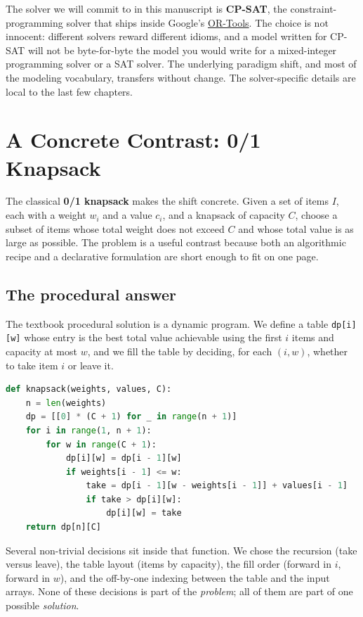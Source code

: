 The solver we will commit to in this manuscript is \textbf{CP-SAT}, the
constraint-programming solver that ships inside Google's
\href{https://developers.google.com/optimization}{OR-Tools}. The choice
is not innocent: different solvers reward different idioms, and a model
written for CP-SAT will not be byte-for-byte the model you would write
for a mixed-integer programming solver or a SAT solver. The underlying
paradigm shift, and most of the modeling vocabulary, transfers without
change. The solver-specific details are local to the last few chapters.

\section{A Concrete Contrast: 0/1 Knapsack}\label{sec:1.1}

The classical \textbf{0/1 knapsack} makes the shift concrete. Given a
set of items \(I\), each with a weight \(w_i\) and a value \(c_i\), and
a knapsack of capacity \(C\), choose a subset of items whose total
weight does not exceed \(C\) and whose total value is as large as
possible. The problem is a useful contrast because both an algorithmic
recipe and a declarative formulation are short enough to fit on one
page.

\subsection{The procedural answer}\label{sec:1.1.1}

The textbook procedural solution is a dynamic program. We define a
table \lstinline!dp[i][w]! whose entry is the best total value
achievable using the first \(i\) items and capacity at most \(w\), and
we fill the table by deciding, for each \((i, w)\), whether to take
item \(i\) or leave it.

\begin{lstlisting}[language=Python]
def knapsack(weights, values, C):
    n = len(weights)
    dp = [[0] * (C + 1) for _ in range(n + 1)]
    for i in range(1, n + 1):
        for w in range(C + 1):
            dp[i][w] = dp[i - 1][w]
            if weights[i - 1] <= w:
                take = dp[i - 1][w - weights[i - 1]] + values[i - 1]
                if take > dp[i][w]:
                    dp[i][w] = take
    return dp[n][C]
\end{lstlisting}

Several non-trivial decisions sit inside that function. We chose the
recursion (take versus leave), the table layout (items by capacity),
the fill order (forward in \(i\), forward in \(w\)), and the off-by-one
indexing between the table and the input arrays. None of these
decisions is part of the \emph{problem}; all of them are part of one
possible \emph{solution}.

